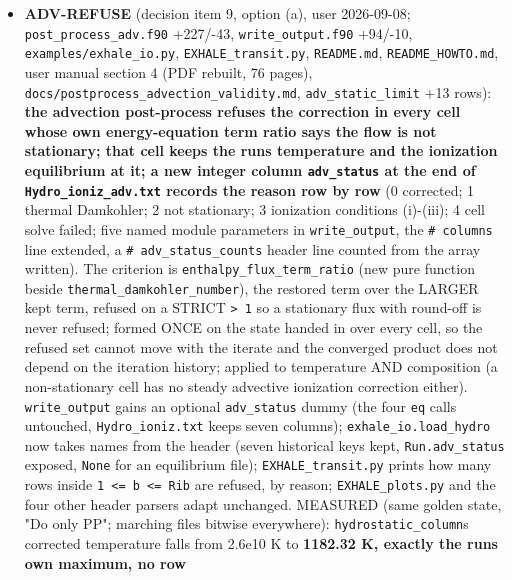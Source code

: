 \documentclass[english,a4paper]{my_memo}
\begin{document}
\begin{itemize}
  O(dt) kick, eight decades, seen for the first time from a stationary
  state); the certification prints no cell-resolved record of the species
  rows, which blocks any floor attribution.
\item
  \textbf{ADV-REFUSE} (decision item 9, option (a), user 2026-09-08;
  \texttt{post\_process\_adv.f90} +227/-43, \texttt{write\_output.f90} +94/-10,
  \texttt{examples/exhale\_io.py}, \texttt{EXHALE\_transit.py}, \texttt{README.md},
  \texttt{README\_HOWTO.md}, user manual section 4 (PDF rebuilt, 76 pages),
  \texttt{docs/postprocess\_advection\_validity.md}, \texttt{adv\_static\_limit} +13 rows):
  \textbf{the advection post-process refuses the correction in every cell whose
  own energy-equation term ratio says the flow is not stationary; that cell
  keeps the run\textquotesingle s temperature and the ionization equilibrium at it; a new
  integer column \texttt{adv\_status} at the end of \texttt{Hydro\_ioniz\_adv.txt} records
  the reason row by row} (0 corrected; 1 thermal Damkohler; 2 not
  stationary; 3 ionization conditions (i)-(iii); 4 cell solve failed; five
  named module parameters in \texttt{write\_output}, the \texttt{\#\ columns} line extended,
  a \texttt{\#\ adv\_status\_counts} header line counted from the array written).
  The criterion is \texttt{enthalpy\_flux\_term\_ratio} (new pure function beside
  \texttt{thermal\_damkohler\_number}), the restored term over the LARGER kept term,
  refused on a STRICT \texttt{\textgreater{}\ 1} so a stationary flux with round-off is never
  refused; formed ONCE on the state handed in over every cell, so the
  refused set cannot move with the iterate and the converged product does
  not depend on the iteration history; applied to temperature AND
  composition (a non-stationary cell has no steady advective ionization
  correction either). \texttt{write\_output} gains an optional \texttt{adv\_status} dummy
  (the four \texttt{\textquotesingle{}eq\textquotesingle{}} calls untouched, \texttt{Hydro\_ioniz.txt} keeps seven columns);
  \texttt{exhale\_io.load\_hydro} now takes names from the header (seven historical
  keys kept, \texttt{Run.adv\_status} exposed, \texttt{None} for an equilibrium file);
  \texttt{EXHALE\_transit.py} prints how many rows inside \texttt{1\ \textless{}=\ b\ \textless{}=\ Rib} are
  refused, by reason; \texttt{EXHALE\_plots.py} and the four other header parsers
  adapt unchanged. MEASURED (same golden state, "Do only PP"; marching
  files bitwise everywhere): \texttt{hydrostatic\_column}\textquotesingle s corrected temperature
  falls from 2.6e10 K to \textbf{1182.32 K, exactly the run\textquotesingle s own maximum, no row
}
\end{itemize}
\end{document}
